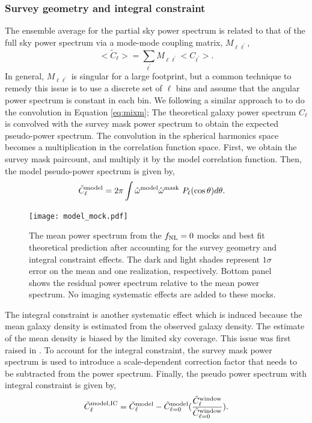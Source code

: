 \subsubsection{Survey geometry and integral constraint}
The ensemble average for the partial sky power spectrum is related to that of the full sky power spectrum via a mode-mode coupling matrix, $M_{\ell \ell^{\prime}}$,
\begin{equation}\label{eq:mixm}
    <\tilde{C}_{\ell}> = \sum_{\ell^{\prime}} M_{\ell \ell^{\prime}}<C_{\ell^{\prime}}>.
\end{equation}
In general, $M_{\ell \ell^{\prime}}$ is singular for a large footprint, but a common technique to remedy this issue is to use a discrete set of $\ell$ bins and assume that the angular power spectrum is constant in each bin. We following a similar approach to \cite{chon2004fast} to do the convolution in Equation \ref{eq:mixm}; The theoretical galaxy power spectrum $C_{\ell}$ is convolved with the survey mask power spectrum to obtain the expected pseudo-power spectrum. The convolution in the spherical harmonics space becomes a multiplication in the correlation function space. First, we obtain the survey mask paircount, and multiply it by the model correlation function. Then, the model pseudo-power spectrum is given by,
\begin{align}
    \tilde{C}^{\rm model}_{\ell} &= 2\pi \int \hat{\omega}^{\rm model}\hat{\omega}^{\rm mask}~P_{\ell}(\cos \theta) d\theta.
\end{align}

 \begin{figure}
\centering
\texttt{[image: model\_mock.pdf]}
\caption{The mean power spectrum from the $f_{\rm NL}=0$ mocks and best fit theoretical prediction after accounting for the survey geometry and integral constraint effects. The dark and light shades represent $1\sigma$ error on the mean and one realization, respectively. Bottom panel shows the residual power spectrum relative to the mean power spectrum. No imaging systematic effects are added to these mocks.}\label{fig:model_mock}
\end{figure}


The integral constraint is another systematic effect which is induced because the mean galaxy density is estimated from the observed galaxy density. The estimate of the mean density is biased by the limited sky coverage. This issue was first raised in \cite{peacock1991large}. To account for the integral constraint, the survey mask power spectrum is used to introduce a scale-dependent correction factor that needs to be subtracted from the power spectrum. Finally, the pseudo power spectrum with integral constraint is given by,
\begin{equation}
     \tilde{C}^{\rm model, IC}_{\ell} = \tilde{C}^{\rm model}_{\ell} - \tilde{C}^{\rm model}_{\ell=0} (\frac{\tilde{C}^{\rm window}_{\ell}}{\tilde{C}^{\rm window}_{\ell=0}}).
\end{equation}


